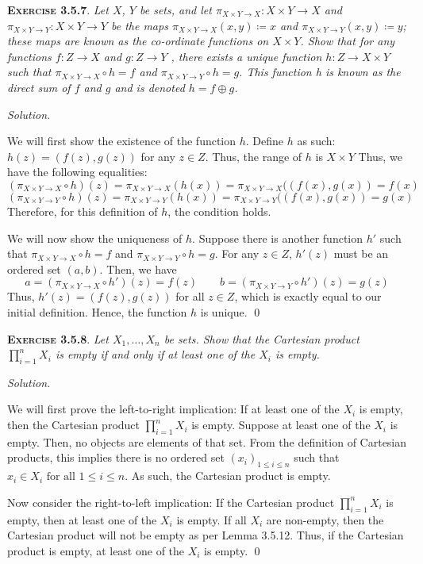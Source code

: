 \documentclass[12pt]{article}
\theoremstyle{remark}
\newenvironment{exer}[2]{
    \noindent \setlength{\parskip}{1em}%
    \textsc{\textbf{Exercise #1}}. \textit{#2} \par
    \noindent \textit{Solution.} %
}{\bigskip}
\begin{document}
\begin{exer}{3.5.7}{
    Let $X$, $Y$ be sets, and let $\pi_{X \times Y \to X} : X \times Y \to X$ and $\pi_{X \times Y \to Y} : X \times Y \to Y$ be the maps $\pi_{X \times Y \to X}(x, y) \coloneqq x$ and $\pi_{X \times Y \to Y} (x, y) \coloneqq y$;
    these maps are known as the \emph{co-ordinate functions} on $X \times Y$.
    Show that for any functions $f : Z \to X$ and $g : Z \to Y$ ,
    there exists a unique function $h : Z \to X \times Y$ such that $\pi_{X \times Y \to X} \circ h = f$ and $\pi_{X \times Y \to Y} \circ h = g$.
    This function h is known as the \emph{direct sum} of $f$ and $g$ and is denoted $h = f \oplus g$.
}
    We will first show the existence of the function $h$.
    Define $h$ as such: $h(z) = (f(z), g(z))$ for any $z \in Z$. Thus, the range of $h$ is $X \times Y$
    Thus, we have the following equalities:
    \[
        (\pi_{X \times Y \to X} \circ h)(z) = \pi_{X \times Y \to X}(h(x)) = \pi_{X \times Y \to X}((f(x), g(x)) = f(x)
    \]
    \[
        (\pi_{X \times Y \to Y} \circ h)(z) = \pi_{X \times Y \to Y}(h(x)) = \pi_{X \times Y \to Y}((f(x), g(x)) = g(x)
    \]
    Therefore, for this definition of $h$, the condition holds.

    We will now show the uniqueness of $h$.
    Suppose there is another function $h'$ such that $\pi_{X \times Y \to X} \circ h = f$ and $\pi_{X \times Y \to Y} \circ h = g$.
    For any $z \in Z$, $h'(z)$ must be an ordered set $(a, b)$.
    Then, we have 
    \[
        a = (\pi_{X \times Y \to X} \circ h')(z) = f(z)
        \qquad
        b = (\pi_{X \times Y \to Y} \circ h')(z) = g(z)
    \]
    Thus, $h'(z) = (f(z), g(z))$ for all $z \in Z$, which is exactly equal to our initial definition.
    Hence, the function $h$ is unique. \qed
\end{exer}


\begin{exer}{3.5.8}{
    Let $X_1, \ldots , X_n$ be sets.
    Show that the Cartesian product $\prod^n_{i=1}X_i$ is empty if and only if at least one of the $X_i$ is empty.
}
    We will first prove the left-to-right implication:
    If at least one of the $X_i$ is empty, then the Cartesian product $\prod^n_{i=1}X_i$ is empty.
    Suppose at least one of the $X_i$ is empty.
    Then, no objects are elements of that set.
    From the definition of Cartesian products, this implies there is no ordered set $(x_i)_{1 \le i \le n}$ such that $x_i \in X_i \text{ for all } 1 \le i \le n$.
    As such, the Cartesian product is empty.    
    
    Now consider the right-to-left implication:
    If the Cartesian product $\prod^n_{i=1}X_i$ is empty, then at least one of the $X_i$ is empty.
    If all $X_i$ are non-empty, then the Cartesian product will not be empty as per Lemma 3.5.12.
    Thus, if the Cartesian product is empty, at least one of the $X_i$ is empty. \qed
\end{exer}
\end{document}
